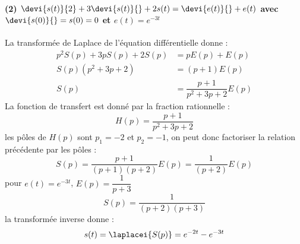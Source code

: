 \paragraph{\textbf{(2) $\devi{s(t)}{2} + 3 \devi{s(t)}{} + 2s(t)=
\devi{e(t)}{} + e(t)$ avec $\devi{s(0)}{}=s(0)=0$ et $e(t) = e^{-3t}$}}
La transformée de Laplace de l'équation différentielle donne :
\begin{align*}
    p^2S(p)+3pS(p)+2S(p)&=pE(p)+E(p)\\
    S(p)(p^2+3p+2)&=(p+1)E(p)\\
    S(p) &= \dfrac{p+1}{p^2+3p+2}E(p)
\end{align*}
La fonction de transfert est donné par la fraction rationnelle :
$$
H(p)=\dfrac{p+1}{p^2+3p+2}
$$
les pôles de $H(p)$ sont $p_1=-2$ et $p_2=-1$, on peut donc factoriser la 
relation précédente par les pôles :
$$
S(p) = \dfrac{p+1}{(p+1)(p+2)}E(p)=\dfrac{1}{(p+2)}E(p)
$$
pour $e(t)=e^{-3t}$, $E(p)=\dfrac{1}{p+3}$
$$
S(p)=\dfrac{1}{(p+2)(p+3)}
$$
la transformée inverse donne :
$$
s(t) = \laplacei{S(p)}=e^{-2t}-e^{-3t}
$$
\begin{center}
\end{center}

\newpage
